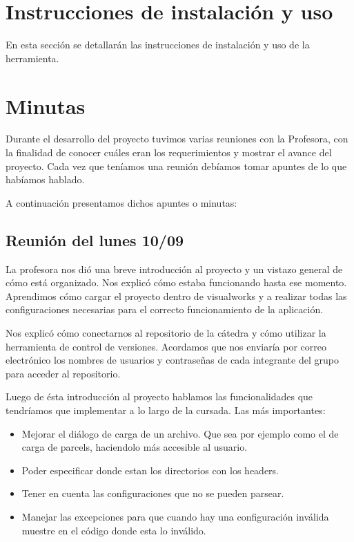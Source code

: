 \documentclass[a4paper,oneside,12pt]{article}
\begin{document}
\section{Instrucciones de instalaci\'on y uso}
En esta secci\'on se detallar\'an las instrucciones de instalaci\'on y uso de la herramienta.

\section{Minutas}
Durante el desarrollo del proyecto tuvimos varias reuniones con la Profesora, con la finalidad de conocer cu\'ales eran los requerimientos y mostrar el avance del proyecto. Cada vez que ten\'iamos una reuni\'on deb\'iamos tomar apuntes de lo que hab\'iamos hablado.

A continuaci\'on presentamos dichos apuntes o minutas:

\subsection{Reuni\'on del lunes 10/09}
La profesora nos di\'o una breve introducci\'on al proyecto y un vistazo general de c\'omo est\'a organizado. Nos explic\'o c\'omo estaba funcionando hasta ese momento. Aprendimos c\'omo cargar el proyecto dentro de visualworks y a realizar todas las configuraciones necesarias para el correcto funcionamiento de la aplicaci\'on.

Nos explic\'o c\'omo conectarnos al repositorio de la c\'atedra y c\'omo utilizar la herramienta de control de versiones.
Acordamos que nos enviar\'ia por correo electr\'onico los nombres de usuarios y contraseñas de cada integrante del grupo para acceder al repositorio.

Luego de \'esta introducci\'on al proyecto hablamos las funcionalidades que tendr\'iamos que implementar a lo largo de la cursada. Las m\'as importantes:

\begin{itemize}
  \item Mejorar el di\'alogo de carga de un archivo. Que sea por ejemplo como el de carga de parcels, haciendolo m\'as accesible al usuario.
  \item Poder especificar donde estan los directorios con los headers.
  \item Tener en cuenta las configuraciones que no se pueden parsear.
  \item Manejar las excepciones para que cuando hay una configuraci\'on inv\'alida muestre en el c\'odigo donde esta lo inv\'alido. 
\end{itemize}
\end{document}
